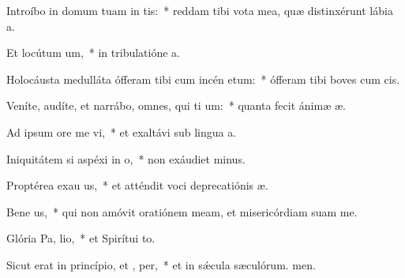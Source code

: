 \item Introíbo in domum tuam in tis:~* reddam tibi vota mea, quæ distinxérunt lábia a.
\item Et locútum   um,~* in tribulatióne a.
\item Holocáusta medulláta ófferam tibi cum incén etum:~* ófferam tibi boves cum cis.
\item Veníte, audíte, et narrábo, omnes, qui ti um:~* quanta fecit ánimæ æ.
\item Ad ipsum ore me vi,~* et exaltávi sub lingua a.
\item Iniquitátem si aspéxi in  o,~* non exáudiet minus.
\item Proptérea exau us,~* et atténdit voci deprecatiónis æ.
\item Bene us,~* qui non amóvit oratiónem meam, et misericórdiam suam  me.
\item Glória Pa,  lio,~* et Spirítui to.
\item Sicut erat in princípio, et ,  per,~* et in sǽcula sæculórum. men.
